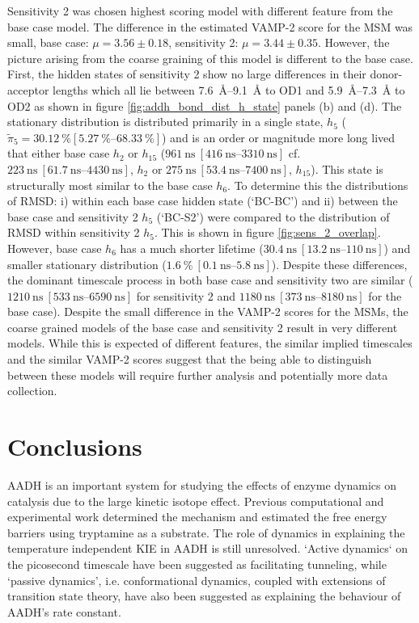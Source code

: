 Sensitivity 2 was chosen highest scoring model with different feature from the base case model.  The difference in the estimated VAMP-2 score for the MSM was small, base case: $\mu=3.56 \pm 0.18$, sensitivity 2: $\mu=3.44 \pm 0.35$. However, the picture arising from the coarse graining of this model is different to the base case.  First, the hidden states of sensitivity 2 show no large differences in their donor-acceptor lengths which all lie between \SIrange{7.6}{9.1}{\angstrom} to OD1 and \SIrange{5.9}{7.3}{\angstrom} to OD2 as shown in figure \ref{fig:addh_bond_dist_h_state} panels (b) and (d). The stationary distribution is distributed primarily in a single state, $h_{5}$ ($\tilde{\pi}_{5} = \SI{30.12}{\percent} [\SIrange{5.27}{68.33}{\percent}]$) and is an order or magnitude more long lived that either base case $h_{2}$ or $h_{15}$ ($\SI{961}{\nano\second}\ [\SIrange[range-phrase=-]{416}{3310}{\nano\second}]$ cf. $\SI{223}{\nano\second}\ [\SIrange[range-phrase=-]{61.7}{4430}{\nano\second}]$, $h_{2}$ or $\SI{275}{\nano\second}\ [\SIrange[range-phrase=-]{53.4}{7400}{\nano\second}]$, $h_{15}$). This state is structurally most similar to the base case $h_{6}$. To determine this  the distributions of RMSD: i) within each base case hidden state (`BC-BC') and ii)  between the base case and sensitivity 2 $h_{5}$ (`BC-S2') were compared to the distribution of RMSD within sensitivity 2 $h_{5}$. This is shown in figure \ref{fig:sens_2_overlap}. However, base case $h_{6}$ has a much shorter lifetime ($\SI{30.4}{\nano\second}\ [\SIrange[range-phrase=-]{13.2}{110}{\nano\second}]$) and smaller stationary distribution ($\SI{1.6}{\percent}\ [\SIrange[range-phrase=-]{0.1}{5.8}{\nano\second}]$). Despite these differences, the dominant timescale process in both base case and sensitivity two are similar ($\SI{1210}{\nano\second}\ [\SIrange[range-phrase=-]{533}{6590}{\nano\second}]$ for sensitivity 2 and  $\SI{1180}{\nano\second}\ [\SIrange[range-phrase=-]{373}{8180}{\nano\second}]$ for the base case). Despite the small difference in the VAMP-2 scores for the MSMs, the coarse grained models of the base case and sensitivity 2 result in very different models. While this is expected of different features, the similar implied timescales  and the similar VAMP-2 scores suggest that the being able to distinguish between these models will require further analysis and potentially more data collection. 


\section{Conclusions}\label{sec:aadh_conclusions}
AADH is an important system for studying the effects of enzyme dynamics on catalysis due to the large kinetic isotope effect. Previous computational and experimental work determined the mechanism and estimated the free energy barriers using tryptamine as a substrate. The role of dynamics in explaining the temperature independent KIE in AADH is still unresolved. `Active dynamics` on the picosecond timescale have been suggested as facilitating tunneling, while  `passive dynamics', i.e. conformational dynamics, coupled with extensions of transition state theory, have also been suggested as explaining the behaviour of AADH's rate constant. 


